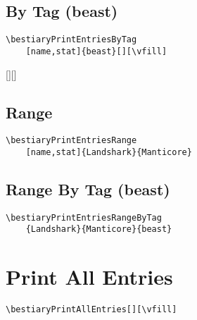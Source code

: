 \documentclass[itdr]{subfiles}
\begin{document}
\vfill

\subsection{By Tag (beast)}

\begin{lstlisting}
\bestiaryPrintEntriesByTag
	[name,stat]{beast}[][\vfill]
\end{lstlisting}

[][\vfill]

\vfill

\subsection{Range}

\begin{lstlisting}
\bestiaryPrintEntriesRange
	[name,stat]{Landshark}{Manticore}
\end{lstlisting}


\vfill

\subsection{Range By Tag (beast)}

\begin{lstlisting}
\bestiaryPrintEntriesRangeByTag
	{Landshark}{Manticore}{beast}
\end{lstlisting}


\vfill
\break

\section{Print All Entries}

\begin{lstlisting}
\bestiaryPrintAllEntries[][\vfill]
\end{lstlisting}

\bestiaryPrintAllEntries[][\vfill]
\end{document}
